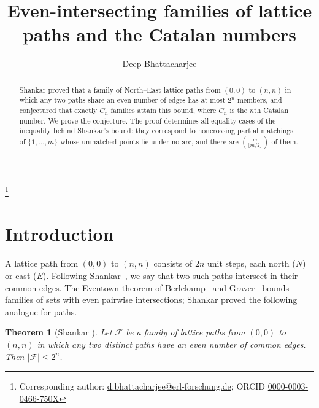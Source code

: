 \documentclass[11pt]{amsart}
\newtheorem*{shankarthm}{Theorem}
\theoremstyle{definition}
\theoremstyle{remark}
\numberwithin{equation}{section}
\begin{document}
\title{Even-intersecting families of lattice paths and the Catalan numbers}

\author{Deep Bhattacharjee}
\address{Formerly, Electro-Gravitational Space Propulsion Laboratory (EGSPL),\newline Bhubaneswar, Odisha 751030, India}
\thanks{Corresponding author: \href{mailto:d.bhattacharjee@erl-forschung.de}{d.bhattacharjee@erl-forschung.de}; ORCID \href{https://orcid.org/0000-0003-0466-750X}{\mbox{0000-0003-0466-750X}}}


\begin{abstract}
Shankar proved that a family of North--East lattice paths from $(0,0)$ to $(n,n)$ in which any two paths share an even number of edges has at most $2^n$ members, and conjectured that exactly $C_n$ families attain this bound, where $C_n$ is the $n$th Catalan number. We prove the conjecture. The proof determines all equality cases of the inequality behind Shankar's bound: they correspond to noncrossing partial matchings of $\{1,\dots,m\}$ whose unmatched points lie under no arc, and there are $\binom{m}{\lfloor m/2\rfloor}$ of them.
\end{abstract}

\maketitle

\section{Introduction}

A lattice path from $(0,0)$ to $(n,n)$ consists of $2n$ unit steps, each north ($N$) or east ($E$). Following Shankar~\cite{Sh}, we say that two such paths intersect in their common edges. The Eventown theorem of Berlekamp~\cite{Be} and Graver~\cite{Gr} bounds families of sets with even pairwise intersections; Shankar proved the following analogue for paths.

\begin{shankarthm}[Shankar {\cite[Theorem~1.4]{Sh}}]
Let $\mathcal F$ be a family of lattice paths from $(0,0)$ to $(n,n)$ in which any two distinct paths have an even number of common edges. Then $|\mathcal F|\le 2^n$.
\end{shankarthm}
\end{document}
